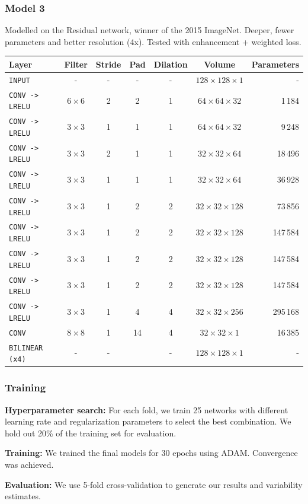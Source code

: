 \documentclass{beamer}
\begin{document}
	\begin{frame}
		\frametitle{Model 3}
		Modelled on the Residual network, winner of the 2015 ImageNet. Deeper, fewer parameters and better resolution (4x). Tested with enhancement + weighted loss.
		
		\footnotesize
		\begin{table}
			\centering
			\begin{tabular}{lcccccr}
			\hline
			\textbf{Layer} & \textbf{Filter} & \textbf{Stride} & \textbf{Pad} & \textbf{Dilation} & \textbf{Volume} & \textbf{Parameters} \\
			\hline
			\texttt{INPUT}	&- & -	& - & - & $128 \times 128 \times 1$ & -\\
			\texttt{CONV -> LRELU}	& $6 \times 6$ & 2 & 2 & 1 & $64 \times 64 \times 32$ & 1\,184\\
			\texttt{CONV -> LRELU}	& $3 \times 3$ & 1 & 1 & 1 & $64 \times 64 \times 32$ & 9\,248\\
			\texttt{CONV -> LRELU}	& $3 \times 3$ & 2 & 1 & 1 & $32 \times 32 \times 64$ & 18\,496\\
			\texttt{CONV -> LRELU}	& $3 \times 3$ & 1 & 1 & 1 & $32 \times 32 \times 64$ & 36\,928\\
			\texttt{CONV -> LRELU}	& $3 \times 3$ & 1 & 2 & 2 & $32 \times 32 \times 128$ & 73\,856\\
			\texttt{CONV -> LRELU}	& $3 \times 3$ & 1 & 2 & 2 & $32 \times 32 \times 128$ & 147\,584\\
			\texttt{CONV -> LRELU}	& $3 \times 3$ & 1 & 2 & 2 & $32 \times 32 \times 128$ & 147\,584\\
			\texttt{CONV -> LRELU}	& $3 \times 3$ & 1 & 2 & 2 & $32 \times 32 \times 128$ & 147\,584\\
			\texttt{CONV -> LRELU}	& $3 \times 3$ & 1 & 4 & 4 & $32 \times 32 \times 256$ & 295\,168\\
			\texttt{CONV}	& $8 \times 8$ & 1 & 14 & 4 & $32 \times 32 \times 1$ & 16\,385\\
			\texttt{BILINEAR (x4)}		& - & - && - & $128 \times 128 \times 1$ & -\\
			\hline
			\end{tabular}
		\end{table}
	\end{frame}
	
	\begin{frame}
	    \frametitle{Training}
	    \textbf{Hyperparameter search:} 
	    For each fold, we train 25 networks with different learning rate and regularization parameters to select the best combination. We hold out 20\% of the training set for evaluation.
	    
	    \medskip
	    \textbf{Training:}	    
	    We trained the final models for 30 epochs using ADAM. Convergence was achieved.
	    
	    \medskip
	    \textbf{Evaluation:}
	    We use 5-fold cross-validation to generate our results and variability estimates.
	    
	\end{frame}
\end{document}
